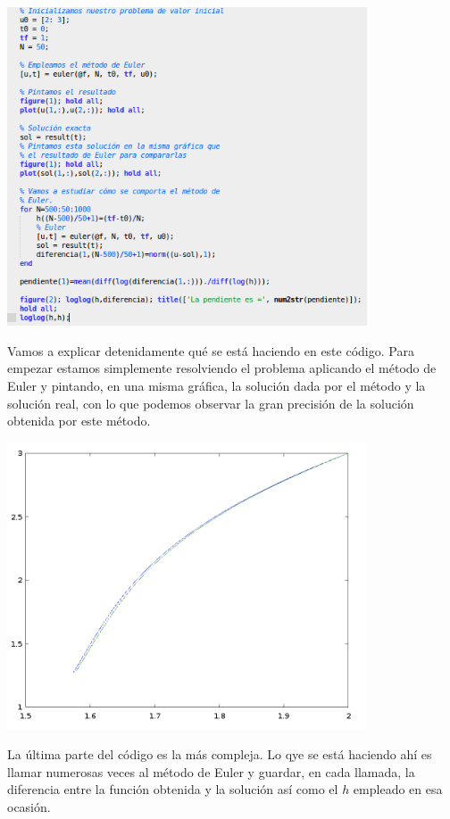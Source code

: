 \begin{center}
\includegraphics[width=0.8\textwidth]{img/aplicacion_euler.png}
\end{center}

Vamos a explicar detenidamente qué se está haciendo en este código. Para empezar estamos simplemente resolviendo el problema aplicando el método de Euler y pintando, en una misma gráfica, la solución dada por el método y la solución real, con lo que podemos observar la gran precisión de la solución obtenida por este método.
\begin{center}
\includegraphics[width=0.8\textwidth]{img/figure1.png}
\end{center}

La última parte del código es la más compleja. Lo qye se está haciendo ahí es llamar numerosas veces al método de Euler y guardar, en cada llamada, la diferencia entre la función obtenida y la solución así como el $h$ empleado en esa ocasión.

